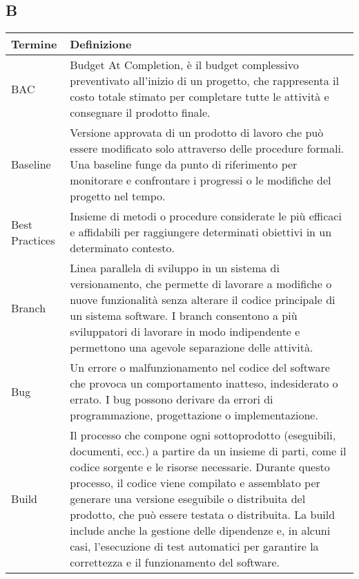 \documentclass[10pt]{article}
\begin{document}
\subsection{B} %
\begin{longtable}{|>{\centering\arraybackslash}m{2.5cm}|>{\arraybackslash}m{12.5cm}|}
\hline
\rowcolor[gray]{0.8}
\textbf{Termine} & \textbf{Definizione}\\
\endhead
\hline
BAC & Budget At Completion, è il budget complessivo preventivato all'inizio di un progetto, che rappresenta il costo totale stimato per completare tutte le attività e consegnare il prodotto finale.\\
\hline
Baseline & Versione approvata di un prodotto di lavoro che può essere modificato solo attraverso delle procedure formali. Una baseline funge da punto di riferimento per monitorare e confrontare i progressi o le modifiche del progetto nel tempo.\\
\hline
Best Practices & Insieme di metodi o procedure considerate le più efficaci e affidabili per raggiungere determinati obiettivi in un determinato contesto.\\
\hline
Branch & Linea parallela di sviluppo in un sistema di versionamento, che permette di lavorare a modifiche o nuove funzionalità senza alterare il codice principale di un sistema software. I branch consentono a più sviluppatori di lavorare in modo indipendente e permettono una agevole separazione delle attività.\\
\hline
Bug & Un errore o malfunzionamento nel codice del software che provoca un comportamento inatteso, indesiderato o errato. I bug possono derivare da errori di programmazione, progettazione o implementazione.\\
\hline
Build & Il processo che compone ogni sottoprodotto (eseguibili, documenti, ecc.) a partire da un insieme di parti, come il codice sorgente e le risorse necessarie. Durante questo processo, il codice viene compilato e assemblato per generare una versione eseguibile o distribuita del prodotto, che può essere testata o distribuita. La build include anche la gestione delle dipendenze e, in alcuni casi, l’esecuzione di test automatici per garantire la correttezza e il funzionamento del software.\\
\hline
\end{longtable}
\end{document}
